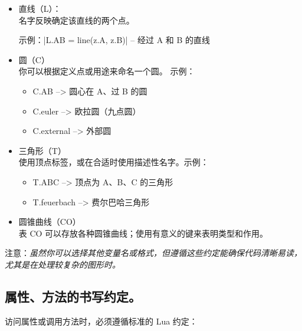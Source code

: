 \begin{itemize}
  \item 直线（L）：\\
  名字反映确定该直线的两个点。

   示例：|L.AB = line(z.A, z.B)| -- 经过 A 和 B 的直线

\item 圆（C）\\
你可以根据定义点或用途来命名一个圆。
示例：
\begin{itemize}
 \item C.AB       --> 圆心在 A、过 B 的圆
 \item C.euler    --> 欧拉圆（九点圆）
 \item C.external --> 外部圆
\end{itemize}

\item 三角形（T）\\
使用顶点标签，或在合适时使用描述性名字。示例：

\begin{itemize}
  \item T.ABC         --> 顶点为 A、B、C 的三角形
  \item T.feuerbach   --> 费尔巴哈三角形

\end{itemize}



\item 圆锥曲线（CO）\\
表 CO 可以存放各种圆锥曲线；使用有意义的键来表明类型和作用。


\end{itemize}

注意：\emph{虽然你可以选择其他变量名或格式，但遵循这些约定能确保代码清晰易读，尤其是在处理较复杂的图形时。}

\subsection{属性、方法的书写约定。}
\label{sub:writing_conventions_for_attributes_methods_and_functions}

访问属性或调用方法时，必须遵循标准的 Lua 约定：

